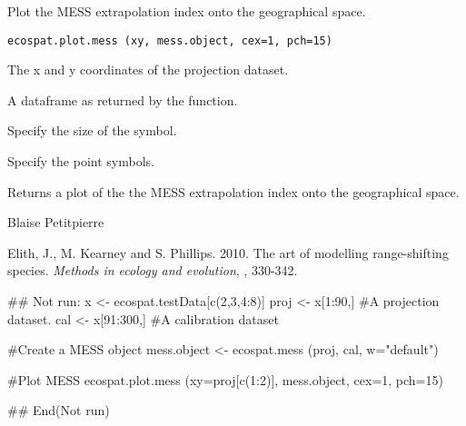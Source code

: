 \documentclass[a4paper]{book}
\begin{document}
%
\begin{Description}\relax
Plot the MESS extrapolation index onto the geographical space.
\end{Description}
%
\begin{Usage}
\begin{verbatim}
ecospat.plot.mess (xy, mess.object, cex=1, pch=15)
\end{verbatim}
\end{Usage}
%
\begin{Arguments}
\begin{ldescription}
\item[\code{xy}] The x and y coordinates of the projection dataset.
\item[\code{mess.object}] A dataframe as returned by the  function.
\item[\code{cex}] Specify the size of the symbol.
\item[\code{pch}] Specify the point symbols.
\end{ldescription}
\end{Arguments}
%
\begin{Value}
Returns a plot of the the MESS extrapolation index onto the geographical space.
\end{Value}
%
\begin{Author}\relax
Blaise Petitpierre 
\end{Author}
%
\begin{References}\relax
Elith, J., M. Kearney and S. Phillips. 2010. The art of modelling range-shifting species. \emph{Methods in ecology and evolution}, , 330-342.
\end{References}
%
\begin{SeeAlso}\relax
{}
\end{SeeAlso}
%
\begin{Examples}
\begin{ExampleCode}
## Not run: 
x <- ecospat.testData[c(2,3,4:8)]
proj <- x[1:90,] #A projection dataset.
cal <- x[91:300,] #A calibration dataset

#Create a MESS object 
mess.object <- ecospat.mess (proj, cal, w="default")

#Plot MESS 
ecospat.plot.mess (xy=proj[c(1:2)], mess.object, cex=1, pch=15)

## End(Not run)
\end{ExampleCode}
\end{Examples}
\end{document}
